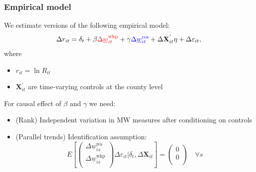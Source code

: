 \documentclass[aspectratio=169, t]{beamer}
\newcommand{\mw}{\underline{w}}
\newcommand{\wkp}{\text{wkp}}
\newcommand{\res}{\text{res}}
\begin{document}
\begin{frame}
    \frametitle{Empirical model}
        
    We estimate versions of the following empirical model:
    $$
    \Delta r_{it} = \delta_t +
        \beta {\color{red}\Delta \mw^{\wkp}_{it}} +
        \gamma {\color{blue} \Delta \mw^{\res}_{it}} + 
        \Delta \mathbf{X}^{'}_{it} \eta + 
        \Delta \varepsilon_{it} ,
    $$    
    where
    \begin{itemize}
        \item $r_{it} = \ln R_{it}$
        \item $\mathbf{X}^{'}_{it}$ are time-varying controls at the county level
    \end{itemize}
    
    \pause
    \vspace{4mm}
    For causal effect of $\beta$ and $\gamma$ we need:
    \begin{itemize}
        \item (Rank) Independent variation in MW measures after conditioning on controls
        \item (Parallel trends) Identification assumption:
        $$
        E\left[
            \begin{pmatrix}
                \Delta \mw^{\res}_{is} \\
                \Delta \mw^{\wkp}_{is} \\
            \end{pmatrix}
            \Delta \varepsilon_{it}
        \bigg| \delta_t, \Delta \mathbf{X}_{it} \right] =
        \begin{pmatrix}
            0 \\
            0 \\
        \end{pmatrix}
        \quad \forall s
        $$
    \end{itemize}
    
\end{frame}
\end{document}

